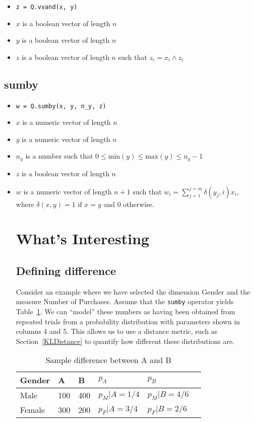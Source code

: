 \begin{itemize}
\item \verb+z = Q.vvand(x, y)+ 
\item \(x\) is a boolean vector of length \(n\)
\item \(y\) is a boolean vector of length \(n\)
\item \(z\) is a boolean vector of length \(n\) such that \(z_i = x_i \wedge z_i\)
\end{itemize}

\subsection{sumby}
\label{sumby}
\begin{itemize}
\item \verb+w = Q.sumby(x, y, n_y, z)+ 
\item \(x\) is a numeric vector of length \(n\)
\item \(y\) is a numeric vector of length \(n\)
\item \(n_y\) is a number such that 
\(0 \leq \mathrm{min}(y) \leq \mathrm{max}(y) \leq n_y-1\)
\item \(z\) is a boolean vector of length \(n\)
\item \(w\) is a numeric vector of length \(n+1\) such that 
\(w_i = \sum_{j=1}^{j=m} \delta(y_j, i) x_i\), where \(\delta(x, y) = 1 \) if
\(x = y\) and 0 otherwise.
\ei

\section{What's Interesting}
\label{interesting}

\subsection{Defining difference}

Consider an example where we have selected the dimension Gender and the measure Number of Purchases. Assume that 
the {\tt sumby} operator yields Table~\ref{tbl_sample_diff}. We can
``model'' these numbers as having been obtained from repeated trials from a
probability distribution with parameters shown in columns 4 and 5. This allows
us to use a distance metric, such as Section~\ref{KLDistance} to quantify how
different these distributions are.

\begin{table}
\centering
\begin{tabular}{|l|l|l|l|l|l|} \hline \hline
{\bf Gender}   & {\bf A } & {\bf B } & \(p_A\) & \(p_B\)  \\ \hline
Male & 100 & 400  &\(p_M|A = 1/4\)  &  \(p_M|B = 4/6\)  \\ \hline
Female & 300 & 200  & \(p_F|A =3/4\) & \(p_F|B = 2/6\)  \\ \hline
\hline
\end{tabular}
\caption{Sample difference between A and B}
\label{tbl_sample_diff}
\end{table}


\end{itemize}
